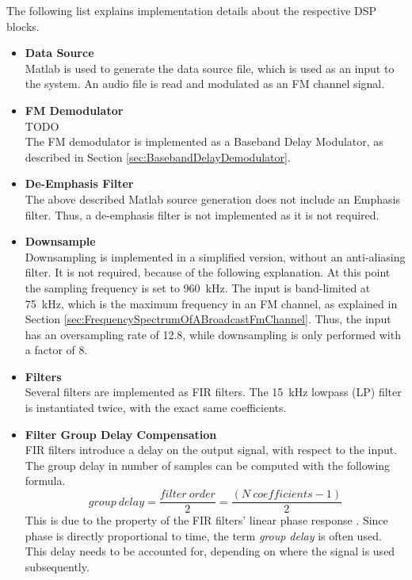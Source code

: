 \noindent
The following list explains implementation details about the respective DSP blocks.
\begin{itemize}
  \item \textbf{Data Source}\\
      Matlab is used to generate the data source file, which is used as an input to the system.
      An audio file is read and modulated as an FM channel signal.

  \item \textbf{FM Demodulator}\\
       TODO\\
      The FM demodulator is implemented as a Baseband Delay Modulator, as described in Section \ref{sec:BasebandDelayDemodulator}.

  \item \textbf{De-Emphasis Filter}\\
      The above described Matlab source generation does not include an Emphasis filter.
      Thus, a de-emphasis filter is not implemented as it is not required.

  \item \textbf{Downsample}\\
      Downsampling is implemented in a simplified version, without an anti-aliasing filter.
      It is not required, because of the following explanation.
      At this point the sampling frequency is set to 960~kHz.
      The input is band-limited at 75~kHz, which is the maximum frequency in an FM channel, as explained in Section \ref{sec:FrequencySpectrumOfABroadcastFmChannel}.
      Thus, the input has an oversampling rate of 12.8, while downsampling is only performed with a factor of 8.

  \item \textbf{Filters}\\
      Several filters are implemented as FIR filters.
      The 15~kHz lowpass (LP) filter is instantiated twice, with the exact same coefficients.

  \item \textbf{Filter Group Delay Compensation}\\
      FIR filters introduce a delay on the output signal, with respect to the input.
      The group delay in number of samples can be computed with the following formula.
      \begin{equation}
        group\ delay = \frac{filter\ order}{2} = \frac{(N\ coefficients - 1)}{2}
      \end{equation}
      This is due to the property of the FIR filters' linear phase response \cite{GaziOrhan2018UDSP}.
      Since phase is directly proportional to time, the term \textit{group delay} is often used.
      This delay needs to be accounted for, depending on where the signal is used subsequently.


\end{itemize}
